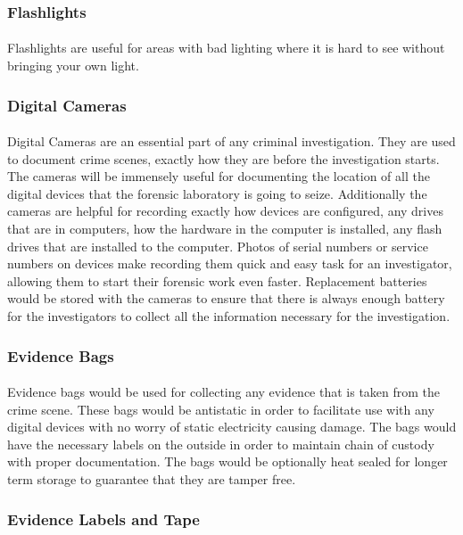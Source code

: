 \documentclass[12pt]{article}
\begin{document}
\subsubsection{Flashlights}
\paragraph{}
Flashlights are useful for areas with bad lighting where it is hard to see without bringing your own light. 
\subsubsection{Digital Cameras}
\paragraph{}
Digital Cameras are an essential part of any criminal investigation.
\cite[p.~122]{hayes}
They are used to document crime scenes, exactly how they are before the investigation starts. 
The cameras will be immensely useful for documenting the location of all the digital devices that the forensic laboratory is going to seize. 
Additionally the cameras are helpful for recording exactly how devices are configured, any drives that are in computers, how the hardware in the computer is installed, any flash drives that are installed to the computer.
Photos of serial numbers or service numbers on devices make recording them quick and easy task for an investigator, allowing them to start their forensic work even faster. 
Replacement batteries would be stored with the cameras to ensure that there is always enough battery for the investigators to collect all the information necessary for the investigation.
\subsubsection{Evidence Bags}
\paragraph{}
Evidence bags would be used for collecting any evidence that is taken from the crime scene.
These bags would be antistatic in order to facilitate use with any digital devices with no worry of static electricity causing damage. 
The bags would have the necessary labels on the outside in order to maintain chain of custody with proper documentation. 
The bags would be optionally heat sealed for longer term storage to guarantee that they are tamper free. 
\subsubsection{Evidence Labels and Tape}
\end{document}
